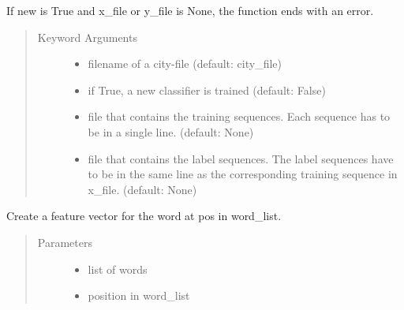 \documentclass[letterpaper,10pt,english]{sphinxmanual}
\begin{document}
\begin{fulllineitems}
\begin{fulllineitems}
If new is True and x\_file or y\_file is None, the function ends
with an error.
\begin{quote}\begin{description}
\item[{Keyword Arguments}] \leavevmode\begin{itemize}
\item {} 
 \textendash{} filename of a city-file (default: city\_file)

\item {} 
 \textendash{} if True, a new classifier is trained (default: False)

\item {} 
 \textendash{} file that contains the training sequences. Each
sequence has to be in a single line. (default: None)

\item {} 
 \textendash{} file that contains the label sequences. The label
sequences have to be in the same line as the corresponding
training sequence in x\_file. (default: None)

\end{itemize}

\end{description}\end{quote}

\end{fulllineitems}


\begin{fulllineitems}
\label{\detokenize{api:impressum_crf.ImpressumCRF.create_features}}
Create a feature vector for the word at pos in word\_list.
\begin{quote}\begin{description}
\item[{Parameters}] \leavevmode\begin{itemize}
\item {} 
 \textendash{} list of words

\item {} 
 \textendash{} position in word\_list

\end{itemize}


\end{description}
\end{quote}
\end{fulllineitems}
\end{fulllineitems}
\end{document}
